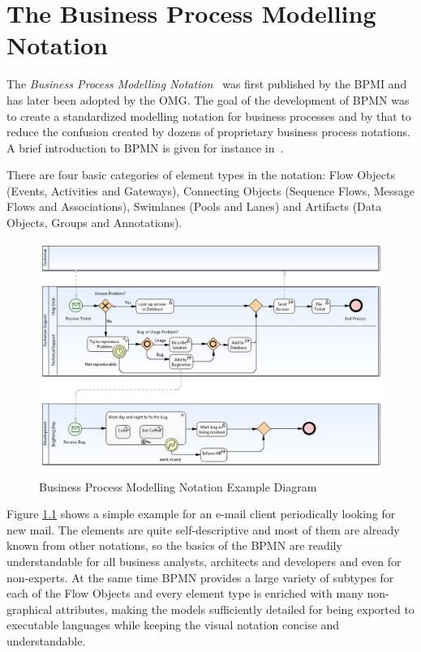 \chapter{The Business Process Modelling Notation}
\label{sec:bpmn}


The \emph{Business Process Modelling Notation}~\cite{omg2009bpmn} was first
published by the BPMI and has later been adopted by the OMG.  The goal of the
development of BPMN was to create a standardized modelling notation for business
processes and by that to reduce the confusion created by dozens of proprietary
business process notations.  A brief introduction to BPMN is given for instance
in~\cite{white2004introduction}.

There are four basic categories of element types in the notation: Flow Objects
(Events, Activities and Gateways), Connecting Objects (Sequence Flows, Message
Flows and Associations), Swimlanes (Pools and Lanes) and Artifacts (Data Objects,
Groups and Annotations).

\begin{figure}[ht]
	\centering
	\includegraphics[width=.8\textwidth]{figures/bpmn/example.png}
	\caption{Business Process Modelling Notation Example Diagram}
	\label{fig:bpmn_example}
\end{figure}

Figure \ref{fig:bpmn_example} shows a simple example for an e-mail client
periodically looking for new mail.  The elements are quite self-descriptive and
most of them are already known from other notations, so the basics of the BPMN
are readily understandable for all business analysts, architects and developers
and even for non-experts.  At the same time BPMN provides a large variety of
subtypes for each of the Flow Objects and every element type is enriched with
many non-graphical attributes, making the models sufficiently detailed for being
exported to executable languages while keeping the visual notation concise and
understandable.


